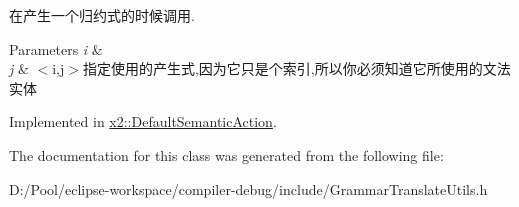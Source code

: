 在产生一个归约式的时候调用. 
\begin{DoxyParams}{Parameters}
{\em i} & \\
\hline
{\em j} & $<$i,j$>$指定使用的产生式,因为它只是个索引,所以你必须知道它所使用的文法实体 \\
\hline
\end{DoxyParams}


Implemented in \hyperlink{classx2_1_1_default_semantic_action_a25f6cc0ccc04c61ad57bfcf10b9c0cb9}{x2\+::\+Default\+Semantic\+Action}.



The documentation for this class was generated from the following file\+:\begin{DoxyCompactItemize}
\item 
D\+:/\+Pool/eclipse-\/workspace/compiler-\/debug/include/Grammar\+Translate\+Utils.\+h\end{DoxyCompactItemize}
